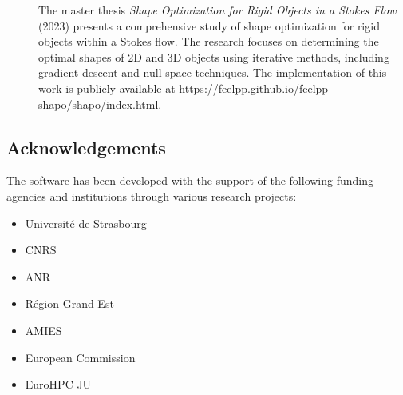 \begin{description}
        \item[] The master thesis \emph{Shape Optimization for Rigid Objects in a Stokes Flow} (2023) presents a comprehensive study of shape optimization for rigid objects within a Stokes flow. The research focuses on determining the optimal shapes of 2D and 3D objects using iterative methods, including gradient descent and null-space techniques. The implementation of this work is publicly available at \url{https://feelpp.github.io/feelpp-shapo/shapo/index.html}.
\end{description}

\subsection{Acknowledgements}
\label{sec::Feelpp:acknowledgements}
The software has been developed with the support of the following funding agencies and institutions through various research projects:
\begin{itemize}
   \item Université de Strasbourg
   \item CNRS
   \item ANR
   \item Région Grand Est
   \item AMIES
   \item European Commission
   \item EuroHPC JU
\end{itemize}
